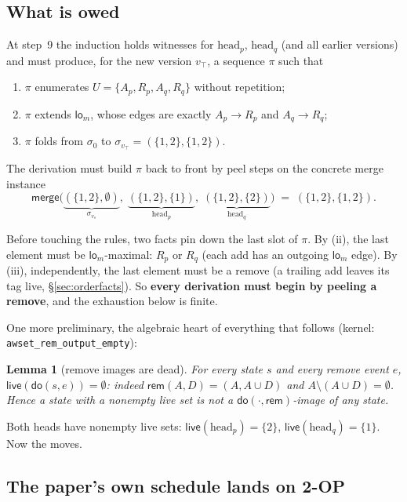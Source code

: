 \documentclass[11pt]{article}
\newtheorem{lemma}[theorem]{Lemma}
\newcommand{\rem}{\mathsf{rem}}
\newcommand{\mergeL}{\mathsf{merge}}
\newcommand{\Sinit}{\sigma_0}
\newcommand{\lom}{\mathsf{lo}_m}
\newcommand{\lean}[1]{\texttt{#1}}
\newcommand{\live}{\mathsf{live}}
\newcommand{\Ap}{A_p}
\newcommand{\Aq}{A_q}
\newcommand{\Rp}{R_p}
\newcommand{\Rq}{R_q}
\begin{document}
\subsection{What is owed}

At step~9 the induction holds witnesses for $\mathrm{head}_p$,
$\mathrm{head}_q$ (and all earlier versions) and must produce, for the
new version $v_\top$, a sequence $\pi$ such that
\begin{enumerate}[label=(\roman*), leftmargin=2.6em]
\item $\pi$ enumerates $U = \{\Ap, \Rp, \Aq, \Rq\}$ without
  repetition;
\item $\pi$ extends $\lom$, whose edges are exactly $\Ap \to \Rp$ and
  $\Aq \to \Rq$;
\item $\pi$ folds from $\Sinit$ to
  $\sigma_{v_\top} = (\{1,2\}, \{1,2\})$.
\end{enumerate}
The derivation must build $\pi$ back to front by peel steps on the
concrete merge instance
\[
  \mergeL\bigl(\underbrace{(\{1,2\},\emptyset)}_{\sigma_{v_s}},\;
  \underbrace{(\{1,2\},\{1\})}_{\mathrm{head}_p},\;
  \underbrace{(\{1,2\},\{2\})}_{\mathrm{head}_q}\bigr)
  \;=\; (\{1,2\},\{1,2\}).
\]

Before touching the rules, two facts pin down the last slot of $\pi$.
By (ii), the last element must be $\lom$-maximal: $\Rp$ or $\Rq$
(each add has an outgoing $\lom$ edge). By (iii), independently, the
last element must be a remove (a trailing add leaves its tag live,
\S\ref{sec:orderfacts}). So \textbf{every derivation must begin by
peeling a remove}, and the exhaustion below is finite.

One more preliminary, the algebraic heart of everything that follows
(kernel: \lean{awset\_rem\_output\_empty}):

\begin{lemma}[remove images are dead]
\label{lem:remimage}
For every state $s$ and every remove event $e$,
$\live(\mathsf{do}(s, e)) = \emptyset$: indeed
$\rem(A, D) = (A, A \cup D)$ and $A \setminus (A \cup D) = \emptyset$.
Hence a state with a nonempty live set is not a
$\mathsf{do}(\cdot,\rem)$-image of \emph{any} state.
\end{lemma}

Both heads have nonempty live sets: $\live(\mathrm{head}_p) = \{2\}$,
$\live(\mathrm{head}_q) = \{1\}$. Now the moves.

\subsection{The paper's own schedule lands on \textsc{2-OP}}
\end{document}
